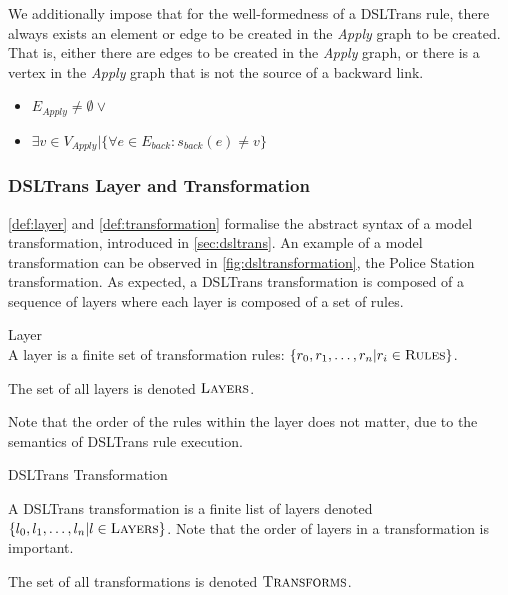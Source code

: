 We additionally impose that for the well-formedness of a DSLTrans rule, there always exists an element or edge to be created in the \textit{Apply} graph to be created. That is, either there are edges to be created in the \textit{Apply} graph, or there is a vertex in the \textit{Apply} graph that is not the source of a backward link.

\begin{itemize}
\item $E_{\textit{Apply}} \neq \emptyset \lor$
\item $ \exists v \in V_{\textit{Apply}} | \big\{\forall e \in E_{back}: s_{back}(e) \neq v \big\}$
\end{itemize}



\subsubsection*{DSLTrans Layer and Transformation}

\cref{def:layer} and \cref{def:transformation} formalise the abstract syntax of a model transformation, introduced in \cref{sec:dsltrans}. An example of a model transformation can be observed in \cref{fig:dsltransformation}, the Police Station transformation. As expected, a DSLTrans transformation is composed of a sequence of layers where each layer is composed of a set of rules.

\begin{definition}{Layer\\}
\label{def:layer}
A layer is a finite set of transformation rules: $\{r_0, r_1, \dots, r_n | r_i \in \textsc{Rules}\}$.

The set of all layers is denoted $\textsc{Layers}$. 
\end{definition}

Note that the order of the rules within the layer does not matter, due to the semantics of DSLTrans rule execution.

\begin{definition}{DSLTrans Transformation\\}
\label{def:transformation}

A DSLTrans transformation is a finite list of layers denoted $\{l_0, l_1, \dots, l_n | l \in \textsc{Layers}\}$. Note that the order of layers in a transformation is important.

The set of all transformations is denoted $\textsc{Transforms}$.



\end{definition}



